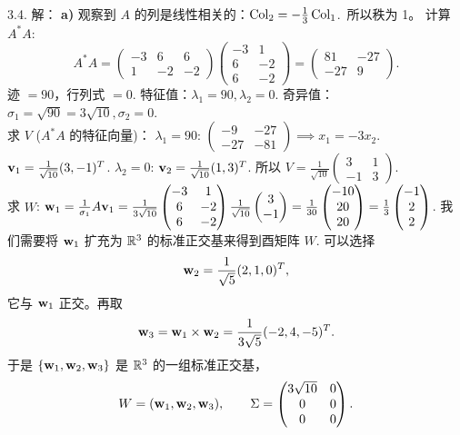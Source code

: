 \begin{exer}
3.4. 解：
\textbf{a)}
观察到 $A$ 的列是线性相关的：$\operatorname{Col}_2 = -\frac{1}{3} \operatorname{Col}_1$.~所以秩为 1。
计算 $A^*A$:
$$ A^*A = \begin{pmatrix} -3 & 6 & 6 \\ 1 & -2 & -2 \end{pmatrix} \begin{pmatrix} -3 & 1 \\ 6 & -2 \\ 6 & -2 \end{pmatrix} = \begin{pmatrix} 81 & -27 \\ -27 & 9 \end{pmatrix}. $$
迹 $= 90$，行列式 $= 0$.
特征值：$\lambda_1 = 90, \lambda_2 = 0$.
奇异值：$\sigma_1 = \sqrt{90} = 3\sqrt{10}, \sigma_2 = 0$.
\\
求 $V$ ($A^*A$ 的特征向量)：
$\lambda_1 = 90$: $\begin{pmatrix} -9 & -27 \\ -27 & -81 \end{pmatrix} \implies x_1 = -3x_2$. $\mathbf{v}_1 = \frac{1}{\sqrt{10}}(3, -1)^T$.
$\lambda_2 = 0$: $\mathbf{v}_2 = \frac{1}{\sqrt{10}}(1, 3)^T$.
所以 $V = \frac{1}{\sqrt{10}} \begin{pmatrix} 3 & 1 \\ -1 & 3 \end{pmatrix}$.
\\
求 $W$:
$\mathbf{w}_1 = \frac{1}{\sigma_1} A \mathbf{v}_1 = \frac{1}{3\sqrt{10}} \begin{pmatrix} -3 & 1 \\ 6 & -2 \\ 6 & -2 \end{pmatrix} \frac{1}{\sqrt{10}} \begin{pmatrix} 3 \\ -1 \end{pmatrix} = \frac{1}{30} \begin{pmatrix} -10 \\ 20 \\ 20 \end{pmatrix} = \frac{1}{3} \begin{pmatrix} -1 \\ 2 \\ 2 \end{pmatrix}$.
我们需要将 $\mathbf{w}_1$ 扩充为 $\mathbb{R}^3$ 的标准正交基来得到酉矩阵 $W$.
可以选择
$$\mathbf{w}_2=\frac1{\sqrt5}(2,1,0)^T,$$
它与 $\mathbf{w}_1$ 正交。再取
$$\mathbf{w}_3=\mathbf{w}_1\times\mathbf{w}_2
=\frac1{3\sqrt5}(-2,4,-5)^T.$$
于是 $\{\mathbf{w}_1,\mathbf{w}_2,\mathbf{w}_3\}$ 是 $\mathbb{R}^3$ 的一组标准正交基，
$$W=(\mathbf{w}_1,\mathbf{w}_2,\mathbf{w}_3),\qquad
\Sigma=\begin{pmatrix}3\sqrt{10}&0\\0&0\\0&0\end{pmatrix}.$$


\end{exer}
